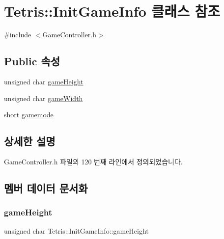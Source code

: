 \hypertarget{class_tetris_1_1_init_game_info}{}\section{Tetris\+:\+:Init\+Game\+Info 클래스 참조}
\label{class_tetris_1_1_init_game_info}


{\ttfamily \#include $<$Game\+Controller.\+h$>$}

\subsection*{Public 속성}
\begin{DoxyCompactItemize}
\item 
unsigned char \hyperlink{class_tetris_1_1_init_game_info_a4b0520a703e20bf84077c2d9706a0ef2}{game\+Height}
\item 
unsigned char \hyperlink{class_tetris_1_1_init_game_info_a035e9d0d8d8b92436b2683627ca51059}{game\+Width}
\item 
short \hyperlink{class_tetris_1_1_init_game_info_a5d4655981462fd53da508dfba0d2e99c}{gamemode}
\end{DoxyCompactItemize}


\subsection{상세한 설명}


Game\+Controller.\+h 파일의 120 번째 라인에서 정의되었습니다.



\subsection{멤버 데이터 문서화}
\mbox{\label{class_tetris_1_1_init_game_info_a4b0520a703e20bf84077c2d9706a0ef2}} 
\subsubsection{\texorpdfstring{game\+Height}{gameHeight}}
{\footnotesize\ttfamily unsigned char Tetris\+::\+Init\+Game\+Info\+::game\+Height}



